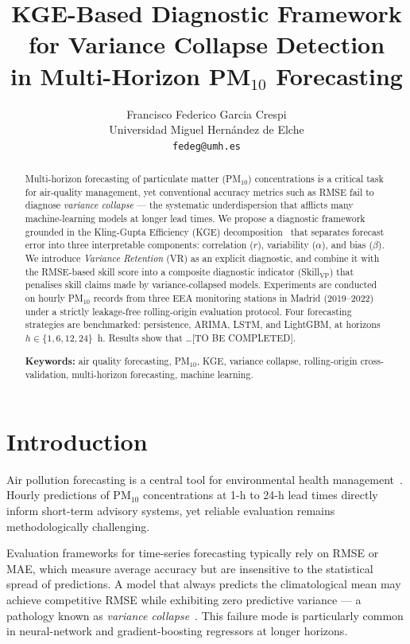 \documentclass[11pt,a4paper]{article}
\title{KGE-Based Diagnostic Framework for Variance Collapse Detection\\
       in Multi-Horizon PM$_{10}$ Forecasting}
\author{Francisco Federico Garcia Crespi\\
        \small Universidad Miguel Hern\'andez de Elche\\
        \small \texttt{fedeg@umh.es}}
\date{}
\begin{document}
\maketitle

\begin{abstract}
Multi-horizon forecasting of particulate matter (PM$_{10}$) concentrations
is a critical task for air-quality management, yet conventional accuracy
metrics such as RMSE fail to diagnose \emph{variance collapse} — the
systematic underdispersion that afflicts many machine-learning models at
longer lead times.
%
We propose a diagnostic framework grounded in the Kling-Gupta Efficiency
(KGE) decomposition~\citep{gupta2009} that separates forecast error into
three interpretable components: correlation ($r$), variability ($\alpha$),
and bias ($\beta$).
%
We introduce \emph{Variance Retention} (VR) as an explicit diagnostic, and
combine it with the RMSE-based skill score into a composite diagnostic
indicator (Skill$_{\mathrm{VP}}$) that penalises skill claims made by
variance-collapsed models.
%
Experiments are conducted on hourly PM$_{10}$ records from three EEA
monitoring stations in Madrid (2019–2022) under a strictly leakage-free
rolling-origin evaluation protocol.
%
Four forecasting strategies are benchmarked: persistence, ARIMA, LSTM, and
LightGBM, at horizons $h \in \{1, 6, 12, 24\}$~h.
%
Results show that \ldots [TO BE COMPLETED].

\medskip
\noindent\textbf{Keywords:} air quality forecasting, PM$_{10}$, KGE, variance
collapse, rolling-origin cross-validation, multi-horizon forecasting,
machine learning.
\end{abstract}

\section{Introduction}\label{sec:intro}

Air pollution forecasting is a central tool for environmental health
management~\citep{WHO2021}.
Hourly predictions of PM$_{10}$ concentrations at 1-h to 24-h lead times
directly inform short-term advisory systems, yet reliable evaluation
remains methodologically challenging.

Evaluation frameworks for time-series forecasting typically rely on RMSE or
MAE, which measure average accuracy but are insensitive to the statistical
spread of predictions.
A model that always predicts the climatological mean may achieve competitive
RMSE while exhibiting zero predictive variance — a pathology known as
\emph{variance collapse}~\citep{Gneiting2007}.
This failure mode is particularly common in neural-network and
gradient-boosting regressors at longer horizons.
\end{document}
